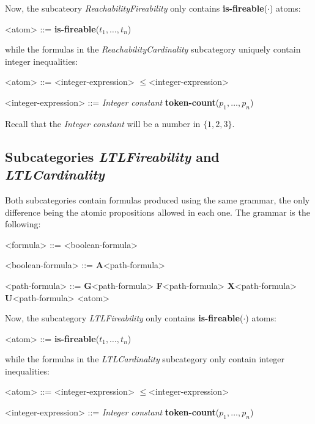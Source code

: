 \documentclass[10pt,english,a4paper]{article}
\newcommand\set[1]           {{\{ #1 \mathclose \}}}
\newcommand\ctla             {\textbf{A}\xspace}
\newcommand\ltlf             {\textbf{F}\xspace}
\newcommand\ltlg             {\textbf{G}\xspace}
\newcommand\ltlx             {\textbf{X}\xspace}
\newcommand\ltlu             {\textbf{U}\xspace}
\newcommand\atomleq          {\boldmath$\leq$\xspace}
\newcommand\atomisfire[1]    {\textbf{is-fireable}(#1)}
\newcommand\atomtokenscnt[1] {\textbf{token-count}(#1)}
\newcommand\mysubsection[1]{\color{sectioncolor}\subsection{#1}\color{defaultcolor}}
\begin{document}
Now, the subcateory \emph{ReachabilityFireability} only contains
\atomisfire{$\cdot$} atoms:

\begin{grammar}
<atom> ::= \atomisfire{$t_1, \ldots, t_n$}
\end{grammar}

while the formulas in the \emph{ReachabilityCardinality} subcategory
uniquely contain integer inequalities:

\begin{grammar}
<atom> ::= <integer-expression> \atomleq <integer-expression>

<integer-expression> ::= \textit{Integer constant}
\alt \atomtokenscnt{$p_1, \ldots, p_n$}
\end{grammar}

Recall that the \textit{Integer constant} will be a number in $\set{1,2,3}$.


\mysubsection{Subcategories \textit{LTLFireability} and \textit{LTLCardinality}}

Both subcategories contain formulas produced using the same grammar, the
only difference being the atomic propositions allowed in each one.
The grammar is the following:

\begin{grammar}

<formula> ::= <boolean-formula>

<boolean-formula> ::= \ctla <path-formula>

<path-formula> ::=
     \ltlg <path-formula>
\alt \ltlf <path-formula>
\alt \ltlx <path-formula>
 \ltlu <path-formula>
\alt <atom>

\end{grammar}

Now, the subcategory \emph{LTLFireability} only contains
\atomisfire{$\cdot$} atoms:

\begin{grammar}
<atom> ::= \atomisfire{$t_1, \ldots, t_n$}
\end{grammar}

while the formulas in the \emph{LTLCardinality} subcategory only contain
integer inequalities:

\begin{grammar}
<atom> ::= <integer-expression> \atomleq <integer-expression>

<integer-expression> ::= \textit{Integer constant}
\alt \atomtokenscnt{$p_1, \ldots, p_n$}
\end{grammar}
\end{document}

